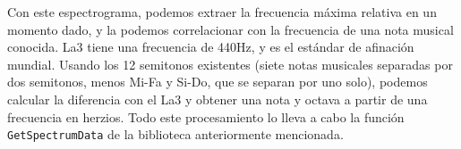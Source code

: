 Con este espectrograma, podemos extraer la frecuencia máxima relativa en un momento dado, y la
podemos correlacionar con la frecuencia de una nota musical conocida. La3 tiene una frecuencia de 440Hz,
y es el estándar de afinación mundial. Usando los 12 semitonos existentes (siete notas musicales separadas
por dos semitonos, menos Mi-Fa y Si-Do, que se separan por uno solo), podemos calcular la diferencia
con el La3 y obtener una nota y octava a partir de una frecuencia en herzios. Todo este
procesamiento lo lleva a cabo la función \texttt{GetSpectrumData} de la biblioteca anteriormente mencionada.
